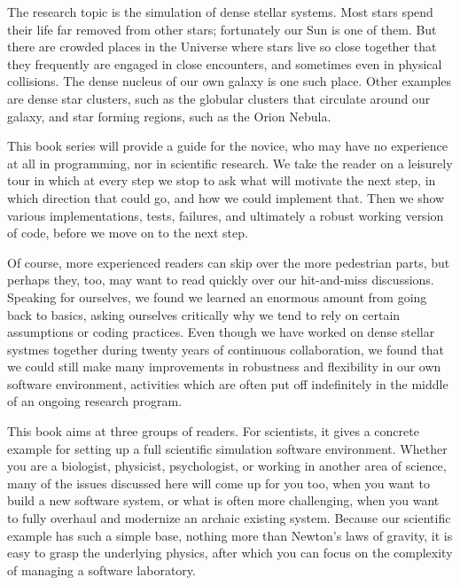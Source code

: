 \documentclass{book}
\begin{document}
The research topic is the simulation of dense stellar systems.
Most stars spend their life far removed from other stars; fortunately
our Sun is one of them.  But there are crowded places in the Universe
where stars live so close together that they frequently are engaged in
close encounters, and sometimes even in physical collisions.  The
dense nucleus of our own galaxy is one such place.  Other examples are
dense star clusters, such as the globular clusters that circulate
around our galaxy, and star forming regions, such as the Orion Nebula.

This book series will provide a guide for the novice, who may have no
experience at all in programming, nor in scientific research.  We take
the reader on a leisurely tour in which at every step we stop to ask
what will motivate the next step, in which direction that could go,
and how we could implement that.  Then we show various
implementations, tests, failures, and ultimately a robust working
version of code, before we move on to the next step.

Of course, more experienced readers can skip over the more pedestrian
parts, but perhaps they, too, may want to read quickly over our
hit-and-miss discussions.  Speaking for ourselves, we found we learned
an enormous amount from going back to basics, asking ourselves
critically why we tend to rely on certain assumptions or coding
practices.  Even though we have worked on dense stellar systmes
together during twenty years of continuous collaboration, we found
that we could still make many improvements in robustness and
flexibility in our own software environment, activities which are
often put off indefinitely in the middle of an ongoing research program.

This book aims at three groups of readers.  For scientists, it gives a
concrete example for setting up a full scientific simulation software
environment.  Whether you are a biologist, physicist, psychologist, or
working in another area of science, many of the issues discussed here
will come up for you too, when you want to build a new software system,
or what is often more challenging, when you want to fully overhaul and
modernize an archaic existing system.  Because our scientific example
has such a simple base, nothing more than Newton's laws of gravity, it
is easy to grasp the underlying physics, after which you can focus on
the complexity of managing a software laboratory.
\end{document}
